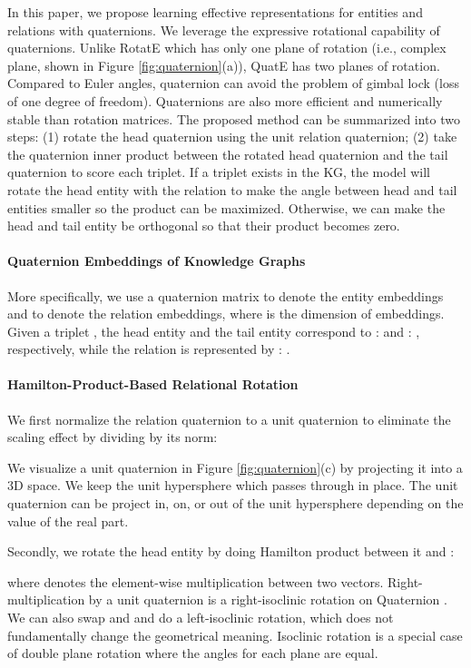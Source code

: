 \documentclass{article}
\begin{document}
In this paper, we propose learning effective representations for entities and relations with quaternions. We leverage the expressive rotational capability of quaternions. Unlike RotatE which has only one plane of rotation (i.e., complex plane, shown in Figure \ref{fig:quaternion}(a)), QuatE has two planes of rotation. Compared to Euler angles, quaternion can avoid the problem of gimbal lock (loss of one degree of freedom). Quaternions are also more efficient and numerically stable than rotation matrices. The proposed method can be summarized into two steps: (1) rotate the head quaternion using the unit relation quaternion; (2) take the quaternion inner product between the rotated head quaternion and the tail quaternion to score each triplet. If a triplet exists in the KG, the model will rotate the head entity with the relation to make the angle between head and tail entities smaller so the product can be maximized. Otherwise, we can make the head and tail entity be orthogonal so that their product becomes zero.

\paragraph{Quaternion Embeddings of Knowledge Graphs}
More specifically, we use a quaternion matrix  to denote the entity embeddings and   to denote the relation embeddings, where  is the dimension of embeddings. Given a triplet , the head entity  and the tail entity  correspond to  :  and  : , respectively, while the relation  is represented by  : .


\paragraph{Hamilton-Product-Based Relational Rotation}
 We first normalize the relation quaternion  to a unit quaternion  to eliminate the scaling effect by dividing  by its norm:


We visualize a unit quaternion in Figure \ref{fig:quaternion}(c) by projecting it into a 3D space. We keep the unit hypersphere which passes through  in place. The unit quaternion can be project in, on, or out of the unit hypersphere depending on the value of the real part.



Secondly, we rotate the head entity  by doing Hamilton product between it and :

where  denotes the element-wise multiplication between two vectors. Right-multiplication by a unit quaternion is  a right-isoclinic rotation on Quaternion . We can also swap  and  and do a left-isoclinic rotation, which does not fundamentally change the geometrical meaning. Isoclinic rotation is a special case of double plane rotation where the angles for each plane are equal.
\end{document}
